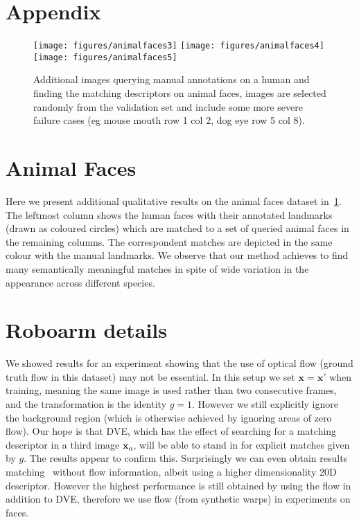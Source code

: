 \documentclass[10pt,twocolumn,letterpaper]{article}
\newcommand{\bx}{\mathbf{x}}
\begin{document}
\clearpage
\onecolumn
\section*{Appendix}
\appendix


\begin{figure}[t]
	\centering
	\texttt{[image: figures/animalfaces3]}\vspace{-1pt}
	\texttt{[image: figures/animalfaces4]}\vspace{-1em}
	\texttt{[image: figures/animalfaces5]}
	
	\caption{Additional images querying manual annotations on a human and finding the matching descriptors on animal faces, images are selected randomly from the validation set and include some more severe failure cases (eg mouse mouth row 1 col 2, dog eye row 5 col 8).}\label{f:animalfacesmore}
\end{figure}

\section{Animal Faces}

Here we present additional qualitative results on the animal faces dataset in~\cref{f:animalfacesmore}. The leftmost column shows the human faces with their annotated landmarks (drawn as coloured circles) which are matched to a set of queried animal faces in the remaining columns. The correspondent matches are depicted in the same colour with the manual landmarks. We observe that our method achieves to find many semantically meaningful matches in spite of wide variation in the appearance across different species.



\section{Roboarm details}

We showed results for an experiment showing that the use of optical flow (ground truth flow in this dataset) may not be essential. In this setup we set $\bx=\bx'$ when training, meaning the same image is used rather than two consecutive frames, and the transformation is the identity $g=1$. However we still explicitly ignore the background region (which is otherwise achieved by ignoring areas of zero flow). Our hope is that DVE, which has the effect of searching for a matching descriptor in a third image $\bx_\alpha$, will be able to stand in for explicit matches given by $g$. The results appear to confirm this. Surprisingly we can even obtain results matching~\cite{thewlis17Bunsupervised} without flow information, albeit using a higher dimensionality 20D descriptor. However the highest performance is still obtained by using the flow in addition to DVE, therefore we use flow (from synthetic warps) in experiments on faces.
\end{document}
